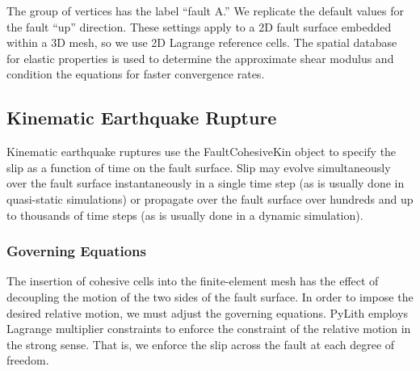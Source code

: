 The group of vertices has the label ``fault A.'' We replicate the
default values for the fault ``up'' direction. These settings apply
to a 2D fault surface embedded within a 3D mesh, so we use 2D Lagrange
reference cells. The spatial database for elastic properties is used
to determine the approximate shear modulus and condition the equations
for faster convergence rates.


\subsection{Kinematic Earthquake Rupture}

Kinematic earthquake ruptures use the FaultCohesiveKin object to specify
the slip as a function of time on the fault surface. Slip may evolve
simultaneously over the fault surface instantaneously in a single
time step (as is usually done in quasi-static simulations) or propagate
over the fault surface over hundreds and up to thousands of time steps
(as is usually done in a dynamic simulation).


\subsubsection{Governing Equations}

The insertion of cohesive cells into the finite-element mesh has the
effect of decoupling the motion of the two sides of the fault surface.
In order to impose the desired relative motion, we must adjust the
governing equations. PyLith employs Lagrange multiplier constraints
to enforce the constraint of the relative motion in the strong sense.
That is, we enforce the slip across the fault at each degree of freedom.

